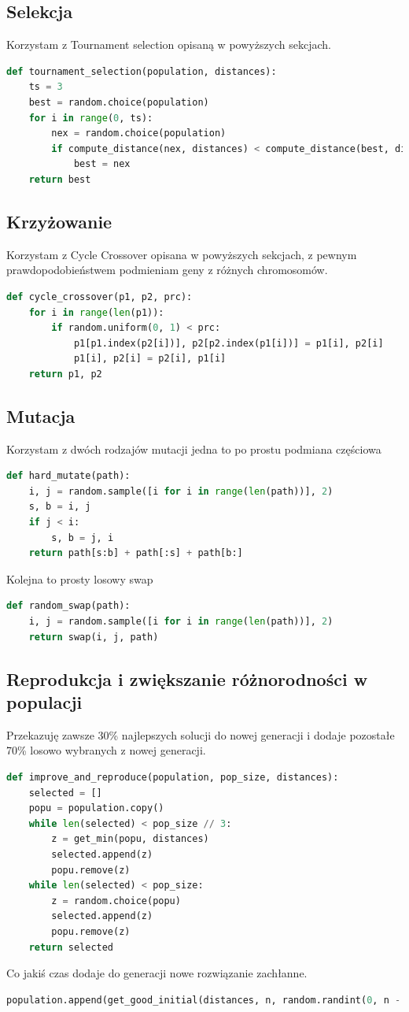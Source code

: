 \documentclass[11pt]{article}
\begin{document}
\subsection{Selekcja}
Korzystam z Tournament selection opisaną w powyższych sekcjach.
\begin{lstlisting}[language=Python]
def tournament_selection(population, distances):
    ts = 3
    best = random.choice(population)
    for i in range(0, ts):
        nex = random.choice(population)
        if compute_distance(nex, distances) < compute_distance(best, distances):
            best = nex
    return best
\end{lstlisting}
\subsection{Krzyżowanie}
Korzystam z Cycle Crossover opisana w powyższych sekcjach, z pewnym prawdopodobieństwem podmieniam geny z różnych chromosomów.
\begin{lstlisting}[language=Python]
def cycle_crossover(p1, p2, prc):
    for i in range(len(p1)):
        if random.uniform(0, 1) < prc:
            p1[p1.index(p2[i])], p2[p2.index(p1[i])] = p1[i], p2[i]
            p1[i], p2[i] = p2[i], p1[i]
    return p1, p2
\end{lstlisting}
\subsection{Mutacja}
Korzystam z dwóch rodzajów mutacji jedna to po prostu podmiana częściowa
\begin{lstlisting}[language=Python]
def hard_mutate(path):
    i, j = random.sample([i for i in range(len(path))], 2)
    s, b = i, j
    if j < i:
        s, b = j, i
    return path[s:b] + path[:s] + path[b:]
\end{lstlisting}
Kolejna to prosty losowy swap
\begin{lstlisting}[language=Python]
def random_swap(path):
    i, j = random.sample([i for i in range(len(path))], 2)
    return swap(i, j, path)
\end{lstlisting}
\subsection{Reprodukcja i zwiększanie różnorodności w populacji}
Przekazuję zawsze 30\% najlepszych solucji do nowej generacji i dodaje pozostałe 70\% losowo wybranych z nowej generacji.
\begin{lstlisting}[language=Python]
def improve_and_reproduce(population, pop_size, distances):
    selected = []
    popu = population.copy()
    while len(selected) < pop_size // 3:
        z = get_min(popu, distances)
        selected.append(z)
        popu.remove(z)
    while len(selected) < pop_size:
        z = random.choice(popu)
        selected.append(z)
        popu.remove(z)
    return selected
\end{lstlisting}
Co jakiś czas dodaje do generacji nowe rozwiązanie zachłanne.
\begin{lstlisting}[language=Python]
        population.append(get_good_initial(distances, n, random.randint(0, n - 1)))
\end{lstlisting}
\end{document}
